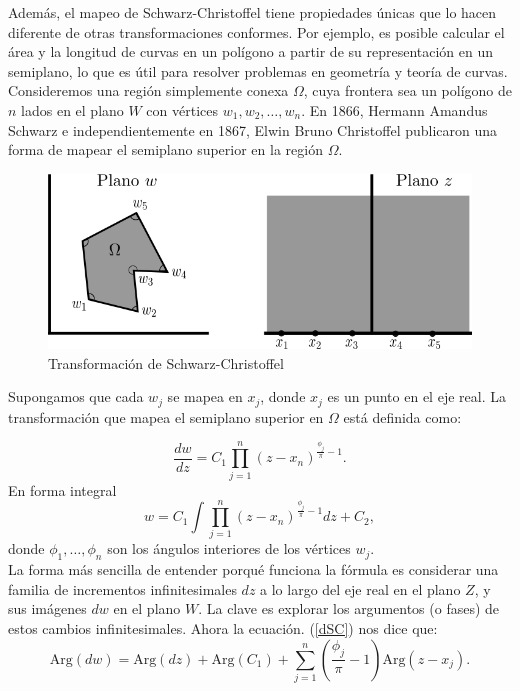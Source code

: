 Además, el mapeo de Schwarz-Christoffel tiene propiedades únicas que lo hacen diferente de otras transformaciones conformes. Por ejemplo, es posible calcular el área y la longitud de curvas en un polígono a partir de su representación en un semiplano, lo que es útil para resolver problemas en geometría y teoría de curvas.\\
Consideremos una región simplemente conexa $\Omega$, cuya frontera sea un polígono de $n$ lados en el plano $W$ con vértices $w_1,w_2,\ldots,w_n$. En 1866, Hermann Amandus Schwarz e independientemente en 1867, Elwin Bruno Christoffel publicaron una forma de mapear el semiplano superior en la región $\Omega$.
\begin{figure}[h!]
	\centering
	\includegraphics[width=0.7\linewidth]{img/sc}
	\caption{Transformación de Schwarz-Christoffel}
	\label{fig:sc}
\end{figure}
Supongamos que cada $w_j$ se mapea en $x_j$, donde $x_j$ es un punto en el eje real.
La transformación que mapea el semiplano superior en   $\Omega$ está definida  como:

\begin{equation}\label{dSC}
	\dfrac{dw}{dz}=C_1\prod_{j=1}^{n}(z-x_n)^{\frac{\phi_j}{\pi}-1}.
\end{equation}
En forma integral
\begin{equation}\label{eSC}
	w=C_1\int \prod_{j=1}^{n}(z-x_n)^{\frac{\phi_j}{\pi}-1} dz +C_2,
\end{equation}
donde $\phi_1,\ldots,\phi_n$ son los ángulos interiores de los vértices $w_j$.\\
La forma más sencilla de entender porqué funciona la fórmula es considerar una familia de incrementos infinitesimales $dz$ a lo largo del eje real en el plano $Z$, y sus imágenes $dw$ en el plano $W$. La clave es explorar los argumentos (o fases) de estos cambios infinitesimales. Ahora la ecuación. (\ref{dSC}) nos dice que:
\begin{equation}\label{SC1}
	\mbox{Arg}(dw)=\mbox{Arg}(dz)+\mbox{Arg}(C_1)+\sum_{j=1}^{n}\left(\dfrac{\phi_j}{\pi}-1\right)\mbox{Arg}(z-x_j).
\end{equation}

